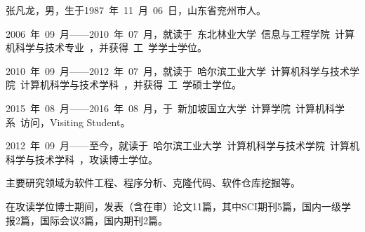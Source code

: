 


张凡龙，男，生于1987~年~11~月~06~日，山东省兖州市人。

2006~年~09~月------2010~年~07~月，就读于~东北林业大学~信息与工程学院~计算机科学与技术专业~，并获得~工~学学士学位。

2010~年~09~月------2012~年~07~月，就读于~哈尔滨工业大学~计算机科学与技术学院~计算机科学与技术学科~，并获得~工~学硕士学位。

2015~年~08~月------2016~年~08~月，于~新加坡国立大学~计算学院~计算机科学系~访问，Visiting Student。

2012~年~09~月------至今，就读于~哈尔滨工业大学~计算机科学与技术学院~计算机科学与技术学科~，攻读博士学位。



主要研究领域为软件工程、程序分析、克隆代码、软件仓库挖掘等。

在攻读学位博士期间，发表（含在审）论文11篇，其中SCI期刊5篇，国内一级学报2篇，国际会议3篇，国内期刊2篇。%

\vspace{3em}\noindent
